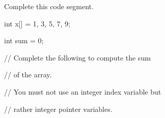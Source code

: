 Complete this code segment.



\begin{consolethree}[escapeinside=||]

int x[] = {1, 3, 5, 7, 9};

int sum = 0;



// Complete the following to compute the sum

// of the array.

// You must not use an integer index variable but

// rather integer pointer variables.

\end{consolethree}

